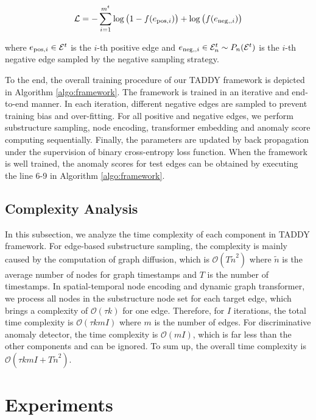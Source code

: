 \documentclass[10pt,journal,compsoc]{IEEEtran}
\begin{document}
\begin{equation}
\label{eq:bce}
\mathcal{L} = -\sum_{i=1}^{m^t} \log \big( 1 - f(e_{{\rm pos},i})\big)+ \log \big(f(e_{{\rm neg},,i})\big)
\end{equation}

\noindent where $e_{{\rm pos},i} \in \mathcal{E}^t$ is the $i$-th positive edge and $e_{{\rm neg},,i} \in \mathcal{E}^t_n \sim P_{n}(\mathcal{E}^t)$ is the $i$-th negative edge sampled by the negative sampling strategy.

To the end, the overall training procedure of our TADDY framework is depicted in Algorithm \ref{algo:framework}. The framework is trained in an iterative and end-to-end manner. In each iteration, different negative edges are sampled to prevent training bias and over-fitting. For all positive and negative edges, we perform substructure sampling, node encoding, transformer embedding and anomaly score computing sequentially. Finally, the parameters are updated by back propagation under the supervision of binary cross-entropy loss function. When the framework is well trained, the anomaly scores for test edges can be obtained by executing the line 6-9 in Algorithm \ref{algo:framework}. 


\subsection{Complexity Analysis} \label{subsec:complexity}
In this subsection, we analyze the time complexity of each component in TADDY framework. For edge-based substructure sampling, the complexity is mainly caused by the computation of graph diffusion, which is $\mathcal{O}(T {\widetilde{n}}^2)$ where $\widetilde{n}$ is the average number of nodes for graph timestamps and $T$ is the number of timestamps. In spatial-temporal node encoding and dynamic graph transformer, we process all nodes in the substructure node set for each target edge, which brings a complexity of $\mathcal{O}(\tau k)$ for one edge. Therefore, for $I$ iterations, the total time complexity is $\mathcal{O}(\tau k m I)$ where $m$ is the number of edges. For discriminative anomaly detector, the time complexity is $\mathcal{O}(m I)$, which is far less than the other components and can be ignored. To sum up, the overall time complexity is $\mathcal{O}(\tau k m I + T {\widetilde{n}}^2)$.


\section{Experiments} \label{sec:exp}
\end{document}
